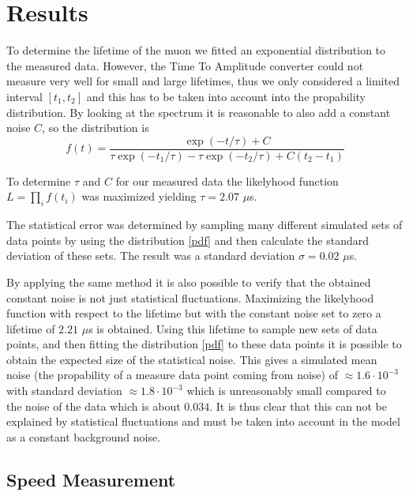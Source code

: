\documentclass[10pt,twocolumn]{article}
\begin{document}
\section{Results}
To determine the lifetime of the muon we fitted an exponential distribution to the measured data. However, the Time To Amplitude converter could not measure very well for small and large lifetimes, thus we only considered a limited interval $[t_1,t_2]$ and this has to be taken into account into the propability distribution. By looking at the spectrum it is reasonable to also add a constant noise $C$, so the distribution is
\begin{equation}
f(t)=\frac{\exp{(-t/\tau)}+C}{\tau\exp{(-t_1/\tau)}-\tau\exp{(-t_2/\tau)}+C(t_2-t_1)}\label{pdf}
\end{equation}

To determine $\tau$ and $C$ for our measured data the likelyhood function $L=\prod_i f(t_i)$ was maximized yielding $\tau=2.07$ $\mu$s. \newline

The statistical error was determined by sampling many different simulated sets of data points by using the distribution \eqref{pdf} and then calculate the standard deviation of these sets. The result was a standard deviation $\sigma=0.02$ $\mu$s. \newline

By applying the same method it is also possible to verify that the obtained constant noise is not just statistical fluctuations. Maximizing the likelyhood function with respect to the lifetime but with the constant noise set to zero a lifetime of $2.21$ $\mu$s is obtained. Using this lifetime to sample new sets of data points, and then fitting the distribution \eqref{pdf} to these data points it is possible to obtain the expected size of the statistical noise. This gives a simulated mean noise (the propability of a measure data point coming from noise) of $\approx1.6\cdot 10^{-3}$ with standard deviation $\approx1.8\cdot 10^{-3}$ which is unreasonably small compared to the noise of the data which is about $0.034$. It is thus clear that this can not be explained by statistical fluctuations and must be taken into account in the model as a constant background noise.

\subsection{Speed Measurement}
\end{document}
